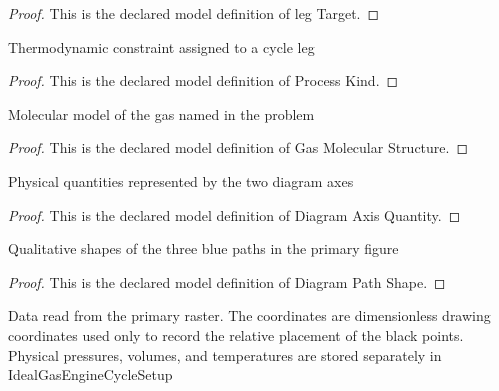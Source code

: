 \begin{proof}
  This is the declared model definition of leg Target.
\end{proof}
\begin{definition}
  \label{def:physics:phyx-mini-0348:phyxminiproblems-problemphyxmini0348-processkind}
  Thermodynamic constraint assigned to a cycle leg
\end{definition}
\begin{proof}
  This is the declared model definition of Process Kind.
\end{proof}
\begin{definition}
  \label{def:physics:phyx-mini-0348:phyxminiproblems-problemphyxmini0348-gasmolecularstructure}
  Molecular model of the gas named in the problem
\end{definition}
\begin{proof}
  This is the declared model definition of Gas Molecular Structure.
\end{proof}
\begin{definition}
  \label{def:physics:phyx-mini-0348:phyxminiproblems-problemphyxmini0348-diagramaxisquantity}
  Physical quantities represented by the two diagram axes
\end{definition}
\begin{proof}
  This is the declared model definition of Diagram Axis Quantity.
\end{proof}
\begin{definition}
  \label{def:physics:phyx-mini-0348:phyxminiproblems-problemphyxmini0348-diagrampathshape}
  Qualitative shapes of the three blue paths in the primary figure
\end{definition}
\begin{proof}
  This is the declared model definition of Diagram Path Shape.
\end{proof}
\begin{definition}
  \label{def:physics:phyx-mini-0348:phyxminiproblems-problemphyxmini0348-pressurevolumediagram}
  Data read from the primary raster. The coordinates are dimensionless drawing coordinates used only to record the relative placement of the black points. Physical pressures, volumes, and temperatures are stored separately in IdealGasEngineCycleSetup
\end{definition}
